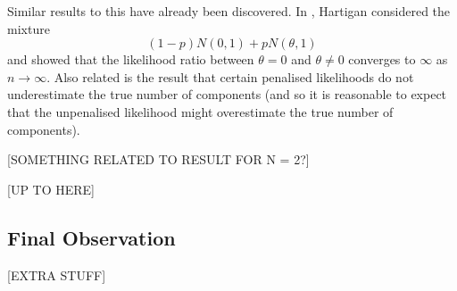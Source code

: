 		Similar results to this have already been discovered. In \cite{Hartigan1985-wn}, Hartigan considered the mixture 
		\begin{equation}
			(1 - p)N(0,1) + pN(\theta, 1)
		\end{equation}
		and showed that the likelihood ratio between $\theta = 0$ and $\theta \neq 0$ converges to $\infty$ as $n \rightarrow \infty$. Also related is the result \cite{Leroux1992-ek} that certain penalised likelihoods do not underestimate the true number of components (and so it is reasonable to expect that the unpenalised likelihood might overestimate the true number of components).

		[SOMETHING RELATED TO RESULT FOR N = 2?]

		[UP TO HERE]

	





	\subsection{Final Observation}
	[EXTRA STUFF]
	
